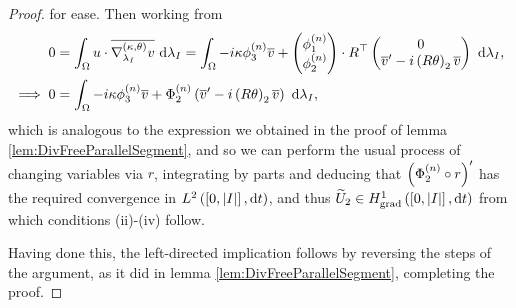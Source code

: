 \begin{proof}
	for ease.
	Then working from
	\begin{align*}
		0 &= \int_{\Omega} u\cdot\overline{\nabla^{\left( \kappa, \theta \right)}_{\lambda_I}v}  \ \mathrm{d}\lambda_I
		= \int_{\Omega} -i\kappa\phi_3^{(n)}\overline{v} + \begin{pmatrix} \phi_1^{(n)} \\ \phi_2^{(n)} \end{pmatrix} \cdot R^{\top} \begin{pmatrix} 0 \\ \overline{v}' - i\left( R\theta \right)_2\overline{v} \end{pmatrix}  \ \mathrm{d}\lambda_I, \\
		\implies 0 &= \int_{\Omega} -i\kappa\phi_3^{(n)}\overline{v} + \Phi_2^{(n)}\left( \overline{v}' - i\left( R\theta \right)_2\overline{v} \right)  \ \mathrm{d}\lambda_I,
	\end{align*}
	which is analogous to the expression we obtained in the proof of lemma \ref{lem:DivFreeParallelSegment}, and so we can perform the usual process of changing variables via $r$, integrating by parts and deducing that $\left( \Phi_2^{(n)}\circ r \right)'$ has the required convergence in $L^{2}\left( \left[ 0,\left\lvert I \right\rvert \right],\mathrm{d}t \right)$, and thus $\widetilde{U}_2\in H^1_\mathrm{grad}\left( \left[ 0,\left\lvert I \right\rvert \right], \mathrm{d}t \right)$ from which conditions (ii)-(iv) follow. \newline
	
	Having done this, the left-directed implication follows by reversing the steps of the argument, as it did in lemma \ref{lem:DivFreeParallelSegment}, completing the proof.
\end{proof}

